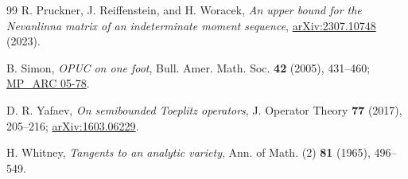 \documentclass[11pt]{article}
\begin{document}
\begin{thebibliography}{99}
R. Pruckner, J. Reiffenstein, and H. Woracek,
\emph{An upper bound for the Nevanlinna matrix of an indeterminate moment sequence},
\href{https://arxiv.org/abs/2307.10748}{arXiv:2307.10748} (2023).

B. Simon,
\emph{OPUC on one foot},
Bull. Amer. Math. Soc. \textbf{42} (2005), 431--460;
\href{https://web.ma.utexas.edu/mp_arc/c/05/05-78.pdf}{MP\_ARC 05-78}.

D. R. Yafaev,
\emph{On semibounded Toeplitz operators},
J. Operator Theory \textbf{77} (2017), 205--216;
\href{https://arxiv.org/abs/1603.06229}{arXiv:1603.06229}.

H. Whitney,
\emph{Tangents to an analytic variety},
Ann. of Math. (2) \textbf{81} (1965), 496--549.

\fussy
\end{thebibliography}
\end{document}
